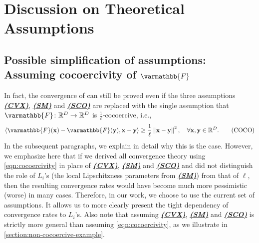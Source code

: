 \documentclass{article}
\newcommand{\algname}[1]{{\color{PineGreen}\sf  #1}\xspace}
\newcommand{\vx}{{\mathbf{x}}}
\newcommand{\vy}{{\mathbf{y}}}
\newcommand{\reals}{\mathbb{R}}
\newcommand{\opF}{{\varmathbb{F}}}
\newcommand{\inprod}[2]{\left\langle #1,#2 \right\rangle}
\newcommand{\sqnorm}[1]{\left\| #1 \right\|^2}
\newcommand{\abbvname}{\algname{PEARL-SGD}}
\theoremstyle{plain}
\theoremstyle{remark}
\begin{document}
\newpage

\section{Discussion on Theoretical Assumptions}
\label{section:assumption-discussion}

\subsection{Possible simplification of assumptions: Assuming cocoercivity of $\opF$}

In fact, the convergence of \algname{\abbvname} can still be proved even if the three assumptions  \hyperref[assumption:convexity]{\textbf{\emph{(CVX)}}}, \hyperref[assumption:smoothness]{\textbf{\emph{(SM)}}} and \hyperref[assumption:star-cocoercivity]{\textbf{\emph{(SCO)}}} are replaced with the single assumption that $\opF\colon \reals^D \to \reals^D$ is $\frac{1}{\ell}$-cocoercive, i.e., 
\begin{align}
    \inprod{\opF(\vx) - \opF(\vy)}{\vx - \vy} \ge \frac{1}{\ell} \sqnorm{\vx - \vy} , \quad \forall \vx, \vy \in \reals^D .
    \label{eqn:cocoercivity}
    \tag{\textbf{\textit{COCO}}}
\end{align}
In the subsequent paragraphs, we explain in detail why this is the case.
However, we emphasize here that if we derived all convergence theory using \eqref{eqn:cocoercivity} in place of \hyperref[assumption:convexity]{\textbf{\emph{(CVX)}}}, \hyperref[assumption:smoothness]{\textbf{\emph{(SM)}}} and \hyperref[assumption:star-cocoercivity]{\textbf{\emph{(SCO)}}} and did not distinguish the role of $L_i$'s (the local Lipschitzness parameters from \hyperref[assumption:smoothness]{\textbf{\emph{(SM)}}}) from that of $\ell$, then the resulting convergence rates would have become much more pessimistic (worse) in many cases.
Therefore, in our work, we choose to use the current set of assumptions.
It allows us to more clearly present the tight dependency of convergence rates to $L_i$'s.
Also note that assuming \hyperref[assumption:convexity]{\textbf{\emph{(CVX)}}}, \hyperref[assumption:smoothness]{\textbf{\emph{(SM)}}} and \hyperref[assumption:star-cocoercivity]{\textbf{\emph{(SCO)}}} is strictly more general than assuming \eqref{eqn:cocoercivity}, as we illustrate in \cref{section:non-cocoercive-example}.
\end{document}
